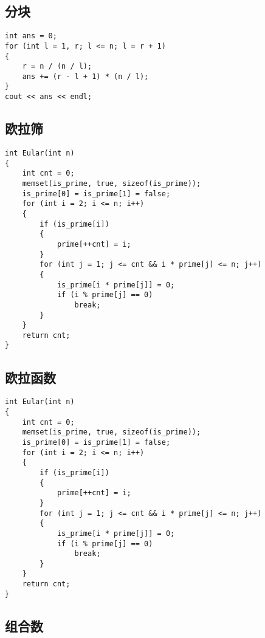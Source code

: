 \documentclass[]{article}
\begin{document}
\hypertarget{ux5206ux5757}{%
\subsection{分块}\label{ux5206ux5757}}

\begin{verbatim}
int ans = 0;
for (int l = 1, r; l <= n; l = r + 1)
{
    r = n / (n / l);
    ans += (r - l + 1) * (n / l);
}
cout << ans << endl;
\end{verbatim}

\hypertarget{ux6b27ux62c9ux7b5b}{%
\subsection{欧拉筛}\label{ux6b27ux62c9ux7b5b}}

\begin{verbatim}
int Eular(int n)
{
    int cnt = 0;
    memset(is_prime, true, sizeof(is_prime));
    is_prime[0] = is_prime[1] = false;
    for (int i = 2; i <= n; i++)
    {
        if (is_prime[i])
        {
            prime[++cnt] = i;
        }
        for (int j = 1; j <= cnt && i * prime[j] <= n; j++)
        {
            is_prime[i * prime[j]] = 0;
            if (i % prime[j] == 0)
                break;
        }
    }
    return cnt;
}
\end{verbatim}

\hypertarget{ux6b27ux62c9ux51fdux6570}{%
\subsection{欧拉函数}\label{ux6b27ux62c9ux51fdux6570}}

\begin{verbatim}
int Eular(int n)
{
    int cnt = 0;
    memset(is_prime, true, sizeof(is_prime));
    is_prime[0] = is_prime[1] = false;
    for (int i = 2; i <= n; i++)
    {
        if (is_prime[i])
        {
            prime[++cnt] = i;
        }
        for (int j = 1; j <= cnt && i * prime[j] <= n; j++)
        {
            is_prime[i * prime[j]] = 0;
            if (i % prime[j] == 0)
                break;
        }
    }
    return cnt;
}
\end{verbatim}

\hypertarget{ux7ec4ux5408ux6570}{%
\subsection{组合数}\label{ux7ec4ux5408ux6570}}
\end{document}
